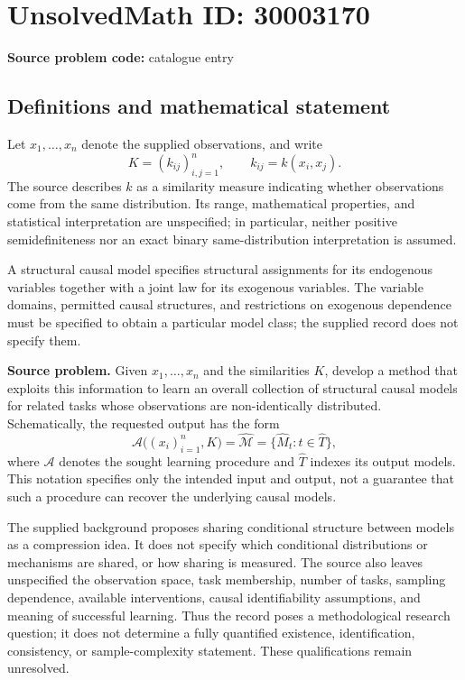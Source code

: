 \documentclass[11pt]{article}
\begin{document}
\section*{UnsolvedMath ID: 30003170}
\textbf{Source problem code:} catalogue entry
\subsection{Definitions and mathematical statement}
Let \(x_1,\ldots,x_n\) denote the supplied observations, and write
\[
K=(k_{ij})_{i,j=1}^{n},\qquad k_{ij}=k(x_i,x_j).
\]
The source describes \(k\) as a similarity measure indicating whether observations come from the same distribution. Its range, mathematical properties, and statistical interpretation are unspecified; in particular, neither positive semidefiniteness nor an exact binary same-distribution interpretation is assumed.

A structural causal model specifies structural assignments for its endogenous variables together with a joint law for its exogenous variables. The variable domains, permitted causal structures, and restrictions on exogenous dependence must be specified to obtain a particular model class; the supplied record does not specify them.

\textbf{Source problem.} Given \(x_1,\ldots,x_n\) and the similarities \(K\), develop a method that exploits this information to learn an overall collection of structural causal models for related tasks whose observations are non-identically distributed. Schematically, the requested output has the form
\[
\mathcal A\bigl((x_i)_{i=1}^{n},K\bigr)
 =\widehat{\mathcal M}
 =\{\widehat M_t:t\in\widehat T\},
\]
where \(\mathcal A\) denotes the sought learning procedure and \(\widehat T\) indexes its output models. This notation specifies only the intended input and output, not a guarantee that such a procedure can recover the underlying causal models.

The supplied background proposes sharing conditional structure between models as a compression idea. It does not specify which conditional distributions or mechanisms are shared, or how sharing is measured. The source also leaves unspecified the observation space, task membership, number of tasks, sampling dependence, available interventions, causal identifiability assumptions, and meaning of successful learning. Thus the record poses a methodological research question; it does not determine a fully quantified existence, identification, consistency, or sample-complexity statement. These qualifications remain unresolved.
\end{document}
